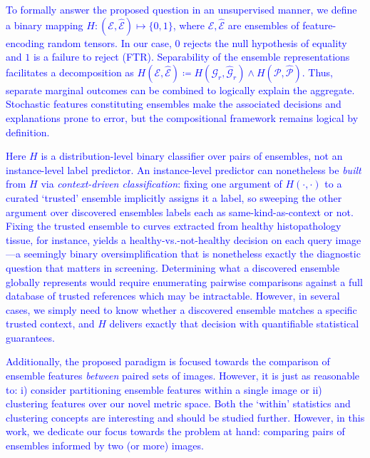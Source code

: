 \documentclass[pdflatex,iicol]{sn-jnl}%
\theoremstyle{thmstyleone}%
\theoremstyle{thmstyletwo}%
\theoremstyle{thmstylethree}%
\begin{document}
\textcolor{blue}{To formally answer the proposed question in an unsupervised manner, we define a binary mapping $H: (\mathcal{E}, \widehat{\mathcal{E}}) \mapsto \lbrace 0, 1\rbrace$, where $\mathcal{E},\widehat{\mathcal{E}}$ are ensembles of feature-encoding random tensors. In our case, $0$ rejects the null hypothesis of equality and $1$ is a failure to reject (FTR). Separability of the ensemble representations facilitates a decomposition as $H(\mathcal{E},\widehat{\mathcal{E}})\coloneqq H(\mathcal{G}_r,\widehat{\mathcal{G}}_r)\wedge H(\mathcal{P},\widehat{\mathcal{P}})$. Thus, separate marginal outcomes can be combined to logically explain the aggregate. Stochastic features constituting ensembles make the associated decisions and explanations prone to error, but the compositional framework remains logical by definition.}

\textcolor{blue}{Here $H$ is a distribution-level binary classifier over pairs of ensembles, not an instance-level label predictor. An instance-level predictor can nonetheless be \emph{built} from $H$ via \textit{context-driven classification}: fixing one argument of $H(\cdot,\cdot)$ to a curated `trusted' ensemble implicitly assigns it a label, so sweeping the other argument over discovered ensembles labels each as same-kind-as-context or not. Fixing the trusted ensemble to curves extracted from healthy histopathology tissue, for instance, yields a healthy-vs.-not-healthy decision on each query image---a seemingly binary oversimplification that is nonetheless exactly the diagnostic question that matters in screening. Determining what a discovered ensemble globally represents would require enumerating pairwise comparisons against a full database of trusted references which may be intractable. However, in several cases, we simply need to know whether a discovered ensemble matches a specific trusted context, and $H$ delivers exactly that decision with quantifiable statistical guarantees.}

\textcolor{blue}{Additionally, the proposed paradigm is focused towards the comparison of ensemble features \textit{between} paired sets of images. However, it is just as reasonable to: i) consider partitioning ensemble features within a single image or ii) clustering features over our novel metric space. Both the `within' statistics and clustering concepts are interesting and should be studied further. However, in this work, we dedicate our focus towards the problem at hand: comparing pairs of ensembles informed by two (or more) images.}
\end{document}

